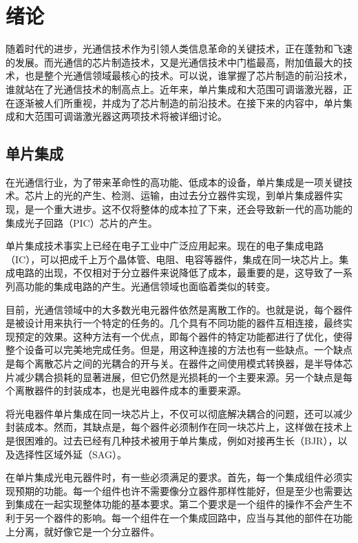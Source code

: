 \documentclass{ZJUthesis}
\begin{document}
\ZJUcontents

\ZJUmainmatter

\chapter{绪论}

随着时代的进步，光通信技术作为引领人类信息革命的关键技术，正在蓬勃和飞速的发展。而光通信的芯片制造技术，又是光通信技术中门槛最高，附加值最大的技术，也是整个光通信领域最核心的技术。可以说，谁掌握了芯片制造的前沿技术，谁就站在了光通信技术的制高点上。近年来，单片集成和大范围可调谐激光器，正在逐渐被人们所重视，并成为了芯片制造的前沿技术。在接下来的内容中，单片集成和大范围可调谐激光器这两项技术将被详细讨论。

\section{单片集成}

在光通信行业，为了带来革命性的高功能、低成本的设备，单片集成是一项关键技术。芯片上的光的产生、检测、运输，由过去分立器件实现，到单片集成器件实现，是一个重大进步。这不仅将整体的成本拉了下来，还会导致新一代的高功能的集成光子回路（PIC）芯片的产生。

单片集成技术事实上已经在电子工业中广泛应用起来。现在的电子集成电路（IC），可以把成千上万个晶体管、电阻、电容等器件，集成在同一块芯片上。集成电路的出现，不仅相对于分立器件来说降低了成本，最重要的是，这导致了一系列高功能的集成电路的产生。光通信领域也面临着类似的转变。

目前，光通信领域中的大多数光电元器件依然是离散工作的。也就是说，每个器件是被设计用来执行一个特定的任务的。几个具有不同功能的器件互相连接，最终实现预定的效果。这种方法有一个优点，即每个器件的特定功能都进行了优化，使得整个设备可以完美地完成任务。但是，用这种连接的方法也有一些缺点。一个缺点是每个离散芯片之间的光耦合的开与关。在器件之间使用模式转换器，是半导体芯片减少耦合损耗的显著进展，但它仍然是光损耗的一个主要来源。另一个缺点是每个离散器件的封装成本，也是光电器件成本的重要来源。

将光电器件单片集成在同一块芯片上，不仅可以彻底解决耦合的问题，还可以减少封装成本。然而，其缺点是，每个器件必须制作在同一块芯片上，这样做在技术上是很困难的。过去已经有几种技术被用于单片集成，例如对接再生长（BJR），以及选择性区域外延（SAG）。

在单片集成光电元器件时，有一些必须满足的要求。首先，每一个集成组件必须实现预期的功能。每一个组件也许不需要像分立器件那样性能好，但是至少也需要达到集成在一起实现整体功能的基本要求。第二个要求是一个组件的操作不会产生不利于另一个器件的影响。每一个组件在一个集成回路中，应当与其他的部件在功能上分离，就好像它是一个分立器件。
\end{document}
